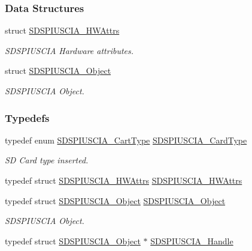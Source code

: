 \subsubsection*{Data Structures}
\begin{DoxyCompactItemize}
\item 
struct \hyperlink{struct_s_d_s_p_i_u_s_c_i_a___h_w_attrs}{S\+D\+S\+P\+I\+U\+S\+C\+I\+A\+\_\+\+H\+W\+Attrs}
\begin{DoxyCompactList}\small\item\em S\+D\+S\+P\+I\+U\+S\+C\+I\+A Hardware attributes. \end{DoxyCompactList}\item 
struct \hyperlink{struct_s_d_s_p_i_u_s_c_i_a___object}{S\+D\+S\+P\+I\+U\+S\+C\+I\+A\+\_\+\+Object}
\begin{DoxyCompactList}\small\item\em S\+D\+S\+P\+I\+U\+S\+C\+I\+A Object. \end{DoxyCompactList}\end{DoxyCompactItemize}
\subsubsection*{Typedefs}
\begin{DoxyCompactItemize}
\item 
typedef enum \hyperlink{_s_d_s_p_i_u_s_c_i_a_8h_ad08dd3019effc5263edc6374ce89d87a}{S\+D\+S\+P\+I\+U\+S\+C\+I\+A\+\_\+\+Cart\+Type} \hyperlink{_s_d_s_p_i_u_s_c_i_a_8h_a5852060f107db1a20619f34ec6bc1f07}{S\+D\+S\+P\+I\+U\+S\+C\+I\+A\+\_\+\+Card\+Type}
\begin{DoxyCompactList}\small\item\em S\+D Card type inserted. \end{DoxyCompactList}\item 
typedef struct \hyperlink{struct_s_d_s_p_i_u_s_c_i_a___h_w_attrs}{S\+D\+S\+P\+I\+U\+S\+C\+I\+A\+\_\+\+H\+W\+Attrs} \hyperlink{_s_d_s_p_i_u_s_c_i_a_8h_a56139edab3ed8a47f5663415ccf8e97d}{S\+D\+S\+P\+I\+U\+S\+C\+I\+A\+\_\+\+H\+W\+Attrs}
\item 
typedef struct \hyperlink{struct_s_d_s_p_i_u_s_c_i_a___object}{S\+D\+S\+P\+I\+U\+S\+C\+I\+A\+\_\+\+Object} \hyperlink{_s_d_s_p_i_u_s_c_i_a_8h_a003d291f9dd29f2cd606896308a2c26a}{S\+D\+S\+P\+I\+U\+S\+C\+I\+A\+\_\+\+Object}
\begin{DoxyCompactList}\small\item\em S\+D\+S\+P\+I\+U\+S\+C\+I\+A Object. \end{DoxyCompactList}\item 
typedef struct \hyperlink{struct_s_d_s_p_i_u_s_c_i_a___object}{S\+D\+S\+P\+I\+U\+S\+C\+I\+A\+\_\+\+Object} $\ast$ \hyperlink{_s_d_s_p_i_u_s_c_i_a_8h_af66bd4e2d64495a7135faf286cee4c0c}{S\+D\+S\+P\+I\+U\+S\+C\+I\+A\+\_\+\+Handle}
\end{DoxyCompactItemize}
